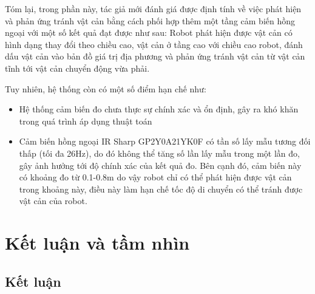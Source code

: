 Tóm lại, trong phần này, tác giả mới đánh giá được định tính về việc phát hiện và phản ứng tránh vật cản bằng cách phối hợp thêm một tầng cảm biến hồng ngoại với một số kết quả đạt được như sau:
Robot phát hiện được vật cản có hình dạng thay đổi theo chiều cao, vật cản ở tầng cao với chiều cao robot, đánh dấu vật cản vào bản đồ giá trị địa phương và phản ứng tránh vật cản từ vật cản tĩnh tới vật cản chuyển động vừa phải.

Tuy nhiên, hệ thống còn có một số điểm hạn chế như:
\begin{itemize}
    \item Hệ thống cảm biến đo chưa thực sự chính xác và ổn định, gây ra khó khăn trong quá trình áp dụng thuật toán
    \item Cảm biến hồng ngoại IR Sharp GP2Y0A21YK0F có tần số lấy mẫu tương đối thấp (tối đa 26Hz), do đó không thể tăng số lần lấy mẫu trong một lần đo, gây ảnh hưởng tới độ chính xác của kết quả đo. Bên cạnh đó, cảm biến này có khoảng đo từ 0.1-0.8m do vậy robot chỉ có thể phát hiện được vật cản trong khoảng này, điều này làm hạn chế tốc độ di chuyển có thể tránh được vật cản của robot.
\end{itemize}



\chapter{Kết luận và tầm nhìn}
\label{chap:KetLuan}

\section{Kết luận}

